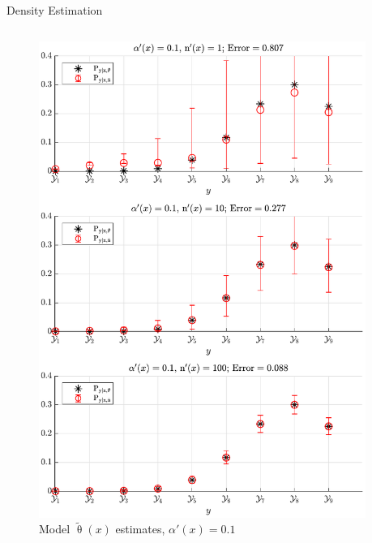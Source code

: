 \documentclass[final]{beamer}
\begin{document}
\begin{frame}{}
\begin{columns}[T]
\begin{column}{.34\linewidth}
\begin{block}{Density Estimation}
\begin{columns}[t]
\begin{column}{.5\linewidth}

\begin{figure}
\centering
\includegraphics[width=0.9\linewidth]{P_yx_error_a0_0_1.pdf}
\caption{Model $\tilde{\uptheta}(x)$ estimates, $\alpha'(x) = 0.1$}
\label{fig:P_yx_error_a0_0_1}
\end{figure}

\end{column}
\begin{column}{.5\linewidth}


\end{column}
\end{columns}
\end{block}
\end{column}
\end{columns}
\end{frame}
\end{document}
